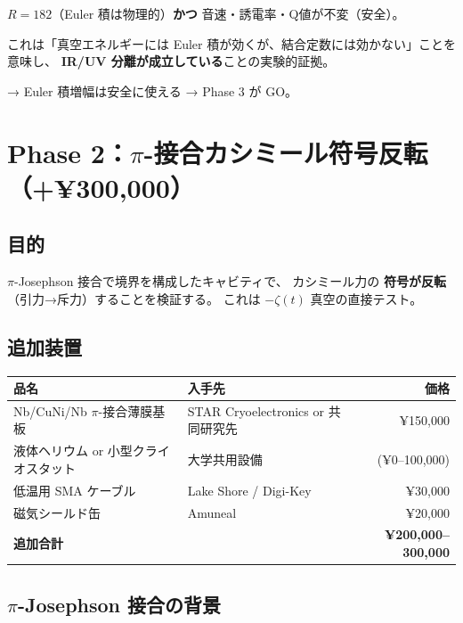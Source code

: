 \documentclass[11pt,a4paper]{article}
\begin{document}
\begin{tcolorbox}[colback=green!5,colframe=green!60!black,title=理想的な結果]
$R = 182$（Euler 積は物理的）\textbf{かつ} 音速・誘電率・Q値が不変（安全）。

これは「真空エネルギーには Euler 積が効くが、結合定数には効かない」ことを意味し、
\textbf{IR/UV 分離が成立している}ことの実験的証拠。

→ Euler 積増幅は安全に使える → Phase 3 が GO。
\end{tcolorbox}


\section{Phase 2：$\pi$-接合カシミール符号反転（+¥300,000）}

\subsection{目的}

$\pi$-Josephson 接合で境界を構成したキャビティで、
カシミール力の \textbf{符号が反転}（引力→斥力）することを検証する。
これは $-\zeta(t)$ 真空の直接テスト。

\subsection{追加装置}

\begin{tcolorbox}[colback=blue!5,colframe=blue!50!black,title=Phase 2 追加部品]
\begin{tabular}{llr}
\toprule
品名 & 入手先 & 価格 \\
\midrule
Nb/CuNi/Nb $\pi$-接合薄膜基板 & STAR Cryoelectronics or 共同研究先 & ¥150,000 \\
液体ヘリウム or 小型クライオスタット & 大学共用設備 & (¥0--100,000) \\
低温用 SMA ケーブル & Lake Shore / Digi-Key & ¥30,000 \\
磁気シールド缶 & Amuneal & ¥20,000 \\
\midrule
\textbf{追加合計} & & \textbf{¥200,000--300,000} \\
\bottomrule
\end{tabular}
\end{tcolorbox}

\subsection{$\pi$-Josephson 接合の背景}
\end{document}

